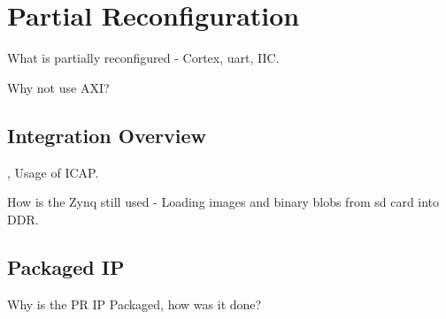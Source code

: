 \section{Partial Reconfiguration}
What is partially reconfigured - Cortex, uart, IIC.

Why not use AXI?

\subsection{Integration Overview}
\cite{xilinx_vivado_2018-1}, \cite{xilinx_vivado_2018}
Usage of ICAP.

How is the Zynq still used - Loading images and binary blobs from sd card into DDR.

\subsection{Packaged IP}
Why is the PR IP Packaged, how was it done? \cite{noauthor_ug1118-vivado-creating-packaging-custom-ip.pdf_nodate}

